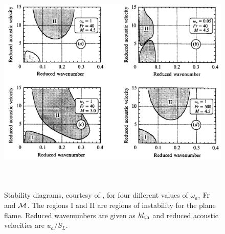 \begin{figure}[t]
\centering
\includegraphics[height=11cm]{assets/graphs/thermoacoustic-stability.png}
\caption{Stability diagrams, courtesy of \cite{searby1991ParametricAcousticInstability}, for four different values of $ω_a$, $\Fr$ and $\Mk$. The regions I and II are regions of instability for the plane flame. Reduced wavenumbers are given as $k l_\rm{th}$ and reduced acoustic velocities are $u_a / S_L$.}
\label{fig:ta-stab}
\end{figure}

